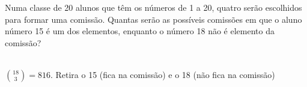 \begin{ex}
 Numa classe de 20 alunos que têm os números de 1 a 20, quatro serão escolhidos para formar uma comissão. Quantas serão as possíveis comissões em que o aluno número 15 é um dos elementos, enquanto o número 18 não é elemento da comissão?
 
  \begin{sol}
        \phantom{A} \\
    $  \binom{18}{3}  = 816$.  Retira o 15 (fica na comissão) e o 18 (não fica na comissão)

 \end{sol}

\end{ex}